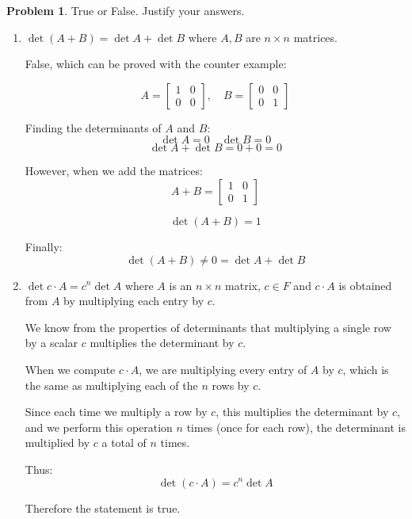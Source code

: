 \documentclass[12pt, oneside]{amsart}
\theoremstyle{definition}
\newtheorem{prob}{Problem}
\begin{document}
\begin{prob} True or False. Justify your answers.
\begin{enumerate}
    \item  $\det (A+B) = \det A  +\det B$ where $A,B$ are $n\times n$ matrices.
    
    \begin{solution}
    False, which can be proved with the counter example:
    
    \[
    A = \begin{bmatrix} 1 & 0 \\ 0 & 0 \end{bmatrix}, \quad B = \begin{bmatrix} 0 & 0 \\ 0 & 1 \end{bmatrix}
    \]
    
    Finding the determinants of $A$ and $B$:
    \[
    \det A = 0 \quad \det B = 0
    \]
    \[
    \det A + \det B = 0 + 0 = 0
    \]
    
    However, when we add the matrices:
    \[
    A + B = \begin{bmatrix} 1 & 0 \\ 0 & 1 \end{bmatrix}
    \]
    
    \[
    \det(A+B) = 1 
    \]

    Finally:
  \[
  \det(A+B) \neq 0 = \det A + \det B
  \]

    \end{solution}
    
    \item $\det c\cdot A = c^n \det A$ where $A$ is an $n\times n$ matrix, $c\in F$ and $c\cdot A$ is obtained from $A$ by multiplying each entry by $c$.
    
    \begin{solution}
    We know from the properties of determinants that multiplying a single row by a scalar $c$ multiplies the determinant by $c$.
    
    When we compute $c \cdot A$, we are multiplying every entry of $A$ by $c$, which is the same as multiplying each of the $n$ rows by $c$.
    
    Since each time we multiply a row by $c$, this multiplies the determinant by $c$, and we perform this operation $n$ times (once for each row), the determinant is multiplied by $c$ a total of $n$ times.

    Thus:
    \[
    \det(c \cdot A) = c^n \det A
    \]
    
    Therefore the statement is true.
    \end{solution}
\end{enumerate}
\end{prob}
\end{document}

